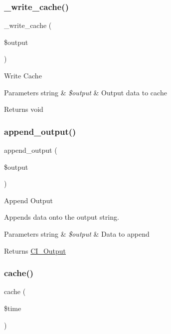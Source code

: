 \subsubsection{\texorpdfstring{\+\_\+write\+\_\+cache()}{\_write\_cache()}}
{\footnotesize\ttfamily \+\_\+write\+\_\+cache (\begin{DoxyParamCaption}\item[{}]{\$output }\end{DoxyParamCaption})}

Write Cache


\begin{DoxyParams}[1]{Parameters}
string & {\em \$output} & Output data to cache \\
\hline
\end{DoxyParams}
\begin{DoxyReturn}{Returns}
void 
\end{DoxyReturn}
\mbox{\label{class_c_i___output_a7c79b8239d6ecbba0c8fdd00bb619651}} 
\subsubsection{\texorpdfstring{append\+\_\+output()}{append\_output()}}
{\footnotesize\ttfamily append\+\_\+output (\begin{DoxyParamCaption}\item[{}]{\$output }\end{DoxyParamCaption})}

Append Output

Appends data onto the output string.


\begin{DoxyParams}[1]{Parameters}
string & {\em \$output} & Data to append \\
\hline
\end{DoxyParams}
\begin{DoxyReturn}{Returns}
\mbox{\hyperlink{class_c_i___output}{C\+I\+\_\+\+Output}} 
\end{DoxyReturn}
\mbox{\label{class_c_i___output_a6eae3cd828cf30926d44f1ab6011f939}} 
\subsubsection{\texorpdfstring{cache()}{cache()}}
{\footnotesize\ttfamily cache (\begin{DoxyParamCaption}\item[{}]{\$time }\end{DoxyParamCaption})}

